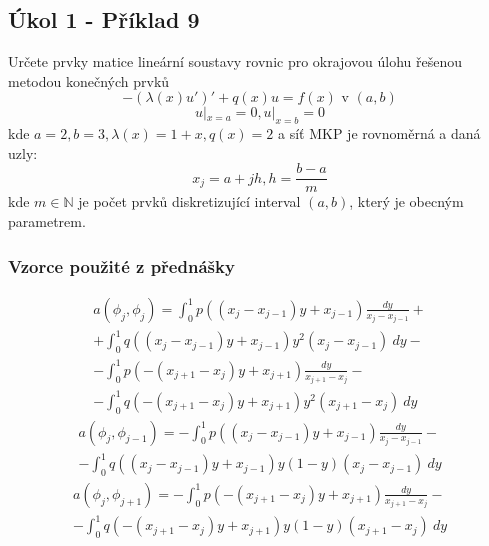 \documentclass[../main.tex]{subfiles}
\begin{document}
\subsection{Úkol 1  - Příklad 9}
Určete prvky matice lineární soustavy rovnic pro okrajovou úlohu řešenou\\ metodou konečných prvků
\begin{equation}
    -(\lambda(x)u')' + q(x)u = f(x) \text{ v } (a,b)
\end{equation}
\begin{equation}
    u|_{x=a} = 0, u|_{x=b} = 0
\end{equation}
kde $a=2, b=3, \lambda(x) = 1+x, q(x)=2$ a síť MKP je rovnoměrná a daná uzly:
\begin{equation}
    x_j = a + jh, h=\frac{b-a}{m}
\end{equation}
kde $m\in \mathbb{N}$ je počet prvků diskretizující interval $(a,b)$, který je obecným parametrem.


\subsubsection{Vzorce použité z přednášky}


\begin{multline}\label{pr1:middle}
    a(\phi_j, \phi_j) = \int_0^1 p((x_j - x_{j-1})y + x_{j-1}) \frac{dy}{x_j - x_{j-1}} +\\+ \int_0^1 q((x_j - x_{j-1})y + x_{j-1}) y^2 (x_j - x_{j-1}) \ dy -\\- \int_0^1 p(-(x_{j+1} - x_j)y + x_{j+1}) \frac{dy}{ x_{j+1} - x_j} -\\- \int_0^1 q(-(x_{j+1} - x_j)y + x_{j+1}) y^2 (x_{j+1} - x_j) \ dy
\end{multline}
\begin{multline}\label{pr1:bellow}
    a(\phi_j, \phi_{j-1}) = - \int_0^1 p((x_j - x_{j-1})y + x_{j-1}) \frac{dy}{x_j - x_{j-1}} -\\- \int_0^1 q((x_j - x_{j-1})y + x_{j-1}) y(1-y) (x_j - x_{j-1}) \ dy
\end{multline}
\begin{multline}\label{pr1:above}
    a(\phi_j, \phi_{j+1}) = - \int_0^1 p(-(x_{j+1} - x_j)y + x_{j+1}) \frac{dy}{ x_{j+1} - x_j} -\\- \int_0^1 q(-(x_{j+1} - x_j)y + x_{j+1}) y(1-y) (x_{j+1} - x_j) \ dy
\end{multline}
\end{document}
